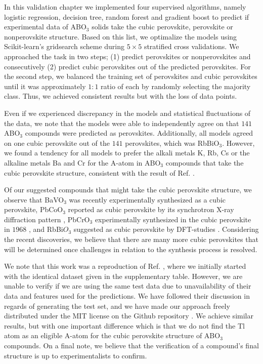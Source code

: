 In this validation chapter we implemented four supervised algorithms, namely logistic regression, decision tree, random forest and gradient boost to predict if experimental data of ABO$_3$ solids take the cubic perovskite, perovskite or nonperovskite structure. Based on this list, we optimalize the models using Scikit-learn's \cite{Pedregosa2012} gridsearch scheme during $5\times 5$ stratified cross validations. We approached the task in two steps; (1) predict perovskites or nonperovskites and consecutively (2) predict cubic perovskites out of the predicted perovskites. For the second step, we balanced the training set of perovskites and cubic perovskites until it was approximately $1:1$ ratio of each by randomly selecting the majority class. Thus, we achieved consistent results but with the loss of data points.

Even if we experienced discrepancy in the models and statistical fluctuations of the data, we note that the models were able to independently agree on that $141$ ABO$_3$ compounds were predicted as perovskites. Additionally, all models agreed on one cubic perovskite out of the $141$ perovskites, which was RbBiO$_3$. However, we found a tendency for all models to prefer the alkali metals K, Rb, Cs or the alkaline metals Ba and Cr for the A-atom in ABO$_3$ compounds that take the cubic perovskite structure, consistent with the result of Ref. \cite{Balachandran2018}.

Of our suggested compounds that might take the cubic perovskite structure, we observe that BaVO$_3$ was recently experimentally synthesized \cite{Nishimura2014} as a cubic perovskite, PbCoO$_3$ reported as cubic perovskite by its synchrotron X-ray diffraction pattern \cite{Sakai2017}, PbCrO$_3$ experimentally synthesized in the cubic perovskite in $1968$ \cite{DeVRIES1968}, and RbBi$O_3$ suggested as cubic perovskite by DFT-studies \cite{Khamari2017}. Considering the recent discoveries, we believe that there are many more cubic perovskites that will be determined once challenges in relation to the synthesis process is resolved.


We note that this work was a reproduction of Ref. \cite{Balachandran2018}, where we initially started with the identical dataset given in the supplementary table. However, we are unable to verify if we are using the same test data due to unavailability of their data and features used for the predictions. We have followed their discussion in regards of generating the test set, and we have made our approach freely distributed under the MIT license on the Github repository \cite{Ohebbi2021a}. We achieve similar results, but with one important difference which is that we do not find the Tl atom as an eligible A-atom for the cubic perovskite structure of ABO$_3$ compounds. On a final note, we believe that the verification of a compound's final structure is up to experimentalists to confirm.
